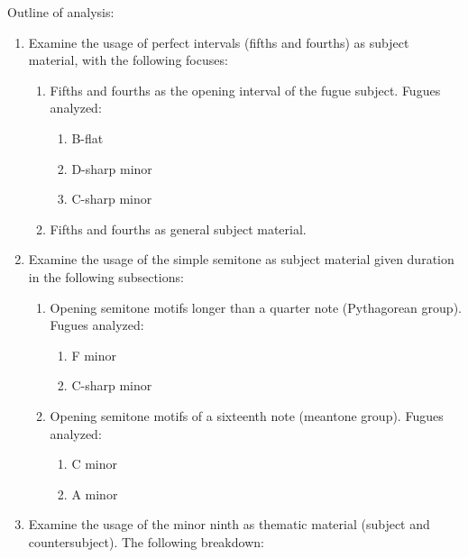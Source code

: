 Outline of analysis:

\begin{enumerate}
\def\labelenumi{\arabic{enumi}.}
\tightlist
\item
  Examine the usage of perfect intervals (fifths and fourths) as subject
  material, with the following focuses:

  \begin{enumerate}
  \def\labelenumii{\arabic{enumii}.}
  \tightlist
  \item
    Fifths and fourths as the opening interval of the fugue subject.
    Fugues analyzed:

    \begin{enumerate}
    \def\labelenumiii{\arabic{enumiii}.}
    \tightlist
    \item
      B-flat
    \item
      D-sharp minor
    \item
      C-sharp minor
    \end{enumerate}
  \item
    Fifths and fourths as general subject material.
  \end{enumerate}
\item
  Examine the usage of the simple semitone as subject material given
  duration in the following subsections:

  \begin{enumerate}
  \def\labelenumii{\arabic{enumii}.}
  \tightlist
  \item
    Opening semitone motifs longer than a quarter note (Pythagorean
    group). Fugues analyzed:

    \begin{enumerate}
    \def\labelenumiii{\arabic{enumiii}.}
    \tightlist
    \item
      F minor
    \item
      C-sharp minor
    \end{enumerate}
  \item
    Opening semitone motifs of a sixteenth note (meantone group). Fugues
    analyzed:

    \begin{enumerate}
    \def\labelenumiii{\arabic{enumiii}.}
    \tightlist
    \item
      C minor
    \item
      A minor
    \end{enumerate}
  \end{enumerate}
\item
  Examine the usage of the minor ninth as thematic material (subject and
  countersubject). The following breakdown:


\end{enumerate}
